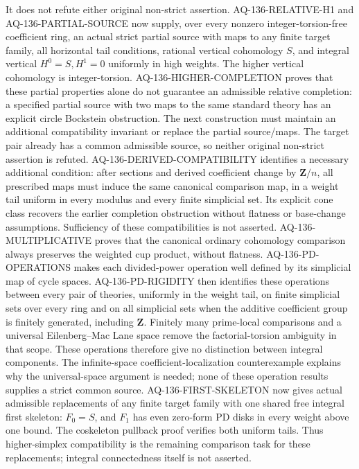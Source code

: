 \begin{description}[style=nextline,leftmargin=0pt]
It does not refute either original non-strict assertion. AQ-136-RELATIVE-H1 and AQ-136-PARTIAL-SOURCE
now supply, over every nonzero integer-torsion-free coefficient ring,
an actual strict partial source with maps to any finite target family,
all horizontal tail conditions, rational vertical cohomology $S$,
and integral vertical $H^0=S,H^1=0$ uniformly in high weights.
The higher vertical cohomology is integer-torsion.
AQ-136-HIGHER-COMPLETION proves that these partial properties alone
do not guarantee an admissible relative completion: a specified
partial source with two maps to the same standard theory has an
explicit circle Bockstein obstruction. The next construction must
maintain an additional compatibility invariant or replace the partial
source/maps. The target pair already has a common admissible source,
so neither original non-strict assertion is refuted.
AQ-136-DERIVED-COMPATIBILITY identifies a necessary additional
condition: after sections and derived coefficient change by
$\mathbf Z/n$, all prescribed maps must induce the same canonical
comparison map, in a weight tail uniform in every modulus and every
finite simplicial set. Its explicit cone class recovers the earlier
completion obstruction without flatness or base-change assumptions.
Sufficiency of these compatibilities is not asserted.
AQ-136-MULTIPLICATIVE proves that the canonical ordinary cohomology
comparison always preserves the weighted cup product, without
flatness. AQ-136-PD-OPERATIONS makes each divided-power operation
well defined by its simplicial map of cycle spaces.
AQ-136-PD-RIGIDITY then identifies these operations between every
pair of theories, uniformly in the weight tail, on finite simplicial
sets over every ring and on all simplicial sets when the additive
coefficient group is finitely generated, including $\mathbf Z$.
Finitely many prime-local comparisons and a universal
Eilenberg--Mac Lane space remove the factorial-torsion ambiguity in
that scope. These operations therefore give no distinction between
integral components. The infinite-space coefficient-localization
counterexample explains why the universal-space argument is needed;
none of these operation results supplies a strict common source.
AQ-136-FIRST-SKELETON now gives actual admissible replacements of
any finite target family with one shared free integral first skeleton:
$F_0=S$, and $F_1$ has even zero-form PD disks in every weight above
one bound. The coskeleton pullback proof verifies both uniform tails.
Thus higher-simplex compatibility is the remaining comparison task
for these replacements; integral connectedness itself is not asserted.

\end{description}
